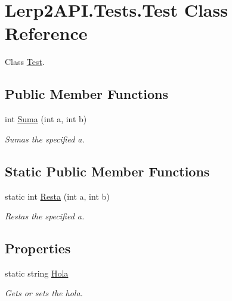 \hypertarget{class_lerp2_a_p_i_1_1_tests_1_1_test}{}\section{Lerp2\+A\+P\+I.\+Tests.\+Test Class Reference}
\label{class_lerp2_a_p_i_1_1_tests_1_1_test}


Class \hyperlink{class_lerp2_a_p_i_1_1_tests_1_1_test}{Test}.  


\subsection*{Public Member Functions}
\begin{DoxyCompactItemize}
\item 
int \hyperlink{class_lerp2_a_p_i_1_1_tests_1_1_test_a46da4cdc88b439a8d40bd10ebae4502e}{Suma} (int a, int b)
\begin{DoxyCompactList}\small\item\em Sumas the specified a. \end{DoxyCompactList}\end{DoxyCompactItemize}
\subsection*{Static Public Member Functions}
\begin{DoxyCompactItemize}
\item 
static int \hyperlink{class_lerp2_a_p_i_1_1_tests_1_1_test_ac97c19d970a06b22b01a3962b5978413}{Resta} (int a, int b)
\begin{DoxyCompactList}\small\item\em Restas the specified a. \end{DoxyCompactList}\end{DoxyCompactItemize}
\subsection*{Properties}
\begin{DoxyCompactItemize}
\item 
static string \hyperlink{class_lerp2_a_p_i_1_1_tests_1_1_test_a3d7e3cff727bb7047e49b310ab1ca9e9}{Hola}
\begin{DoxyCompactList}\small\item\em Gets or sets the hola. \end{DoxyCompactList}\end{DoxyCompactItemize}


